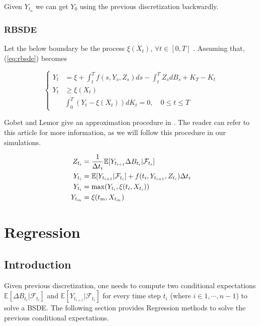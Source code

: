 \documentclass[english,11pt,openany]{report}
\theoremstyle{definition}
\newcommand\blankpage{%
	\null
	\thispagestyle{empty}%
	\addtocounter{page}{-1}%
	\newpage}
\theoremstyle{plain}
\theoremstyle{definition}
\begin{document}
Given $Y_{t_n}$ we can get $Y_0$ using the previous discretization backwardly. 

\subsection{RBSDE}

Let the below boundary be the process $\xi(X_t)$, $\forall t \in [0, T]$ . Assuming that,  (\ref{eq:rbsde}) becomes 

\begin{equation}
\left\{
\begin{aligned}\label{eq:rbsdef}
Y_t &= \xi + \int_{t}^{T}f(s, Y_s, Z_s)ds- \int_{t}^{T}Z_sdB_s + K_T - K_t\\
Y_t &\geq \xi(X_t)\\
&\int_{0}^{T}(Y_t - \xi(X_t))dK_t=0, \quad 0\leq t \leq T
\end{aligned}
\right.
\end{equation}

Gobet and Lemor give an approximation procedure in \cite{gobet2008numerical}. 
The reader can refer to this article for more information, as we will follow this procedure in our simulations. 

\begin{align}
Z_{t_i} &= \frac{1}{\Delta t_i}\mathbb{E}[Y_{t_{i + 1}} \Delta B_{t_i}  | \mathcal{F}_{t_i}] \notag \\
Y_{t_i} &= \mathbb{E}[Y_{t_{i + 1}} | \mathcal{F}_{t_i}] +  f(t_i, Y_{t_{i + 1}}, Z_{t_i})\Delta t_i \notag \\
Y_{t_i} &= \max(Y_{t_i}, \xi(t_i, X_{t_i})) \notag \\
Y_{t_m} & = \xi (t_m, X_{t_m}) \notag
\end{align}


\blankpage



\newpage
\chapter{Regression}

\section{Introduction}

Given previous discretization, one needs to compute two conditional expectations $\mathbb{E}[\Delta B_{t_i}| \mathcal{F}_{t_i}]$ and $\mathbb{E}[Y_{t_{i + 1}} | \mathcal{F}_{t_i}]$ for every time step $t_i$ (where $i \in {1, \cdots , n - 1}$) to solve a BSDE.
The following section provides Regression methods to solve the previous conditional expectations.
\end{document}
